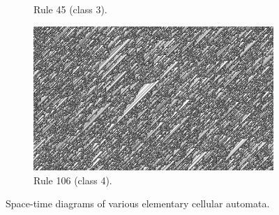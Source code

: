 \documentclass[12pt]{article}
\begin{document}
\begin{figure} [!h]
\begin{subfigure}{.5\textwidth}
  \caption{Rule 45 (class 3).}
  \label{fig:rule45}
\end{subfigure}
\begin{subfigure}{.5\textwidth}
  \centering
  \includegraphics[width=.9\linewidth]{rule106}
  \caption{Rule 106 (class 4).}
  \label{fig:rule106}
\end{subfigure}
\caption{Space-time diagrams of various elementary cellular automata.}
\label{fig:eca-complex-rules}
\end{figure}
\end{document}
